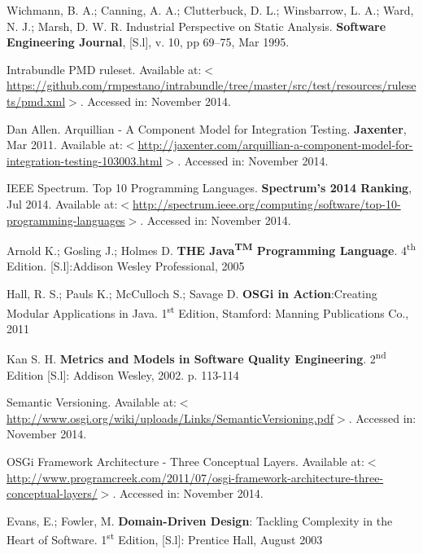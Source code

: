 \documentclass[cic,tc,english]{iiufrgs} %
\newcommand{\ts}{\textsuperscript}
\begin{document}
\begin{thebibliography}{este-parametro-nao-eh-usado-pelo-estilo-ABNT}
Wichmann, B. A.; Canning, A. A.; Clutterbuck, D. L.; Winsbarrow, L. A.; Ward, N. J.; Marsh, D. W. R.
Industrial Perspective on Static Analysis. \textbf{Software Engineering Journal}, [S.l], v. 10, pp 69–75, Mar 1995.

Intrabundle PMD ruleset. Available at:$<$\url{https://github.com/rmpestano/intrabundle/tree/master/src/test/resources/rulesets/pmd.xml}$>$. Accessed in: November 2014.

 Dan Allen.
Arquillian - A Component Model for Integration Testing. \textbf{Jaxenter}, Mar 2011. Available at:$<$\url{http://jaxenter.com/arquillian-a-component-model-for-integration-testing-103003.html}$>$. Accessed in: November 2014.

 IEEE Spectrum.
Top 10 Programming Languages. \textbf{Spectrum’s 2014 Ranking}, Jul 2014. Available at:$<$\url{http://spectrum.ieee.org/computing/software/top-10-programming-languages}$>$. Accessed in: November 2014.

 Arnold K.; Gosling J.; Holmes D.
\textbf{THE Java\ts{TM} Programming Language}. 4\ts{th} Edition. [S.l]:Addison Wesley Professional, 2005

 Hall, R. S.; Pauls K.; McCulloch S.; Savage D.
\textbf{OSGi in Action}:Creating Modular Applications in Java. 1\ts{st} Edition, Stamford: Manning Publications Co., 2011
 
 Kan S. H.
\textbf{Metrics and Models in Software Quality Engineering}. 2\ts{nd} Edition [S.l]: Addison Wesley, 2002. p. 113-114

Semantic Versioning. Available at:$<$\url{http://www.osgi.org/wiki/uploads/Links/SemanticVersioning.pdf}$>$. Accessed in: November 2014.

OSGi Framework Architecture - Three Conceptual Layers. Available at:$<$\url{http://www.programcreek.com/2011/07/osgi-framework-architecture-three-conceptual-layers/}$>$. Accessed in: November 2014.

 Evans, E.; Fowler, M.
\textbf{Domain-Driven Design}: Tackling Complexity in the Heart of Software. 1\ts{st} Edition, [S.l]: Prentice Hall, August 2003

\end{thebibliography}
\end{document}

